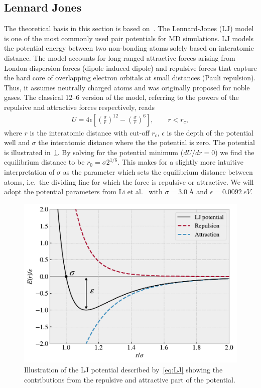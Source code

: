 \subsection{Lennard Jones}\label{sec:LJ}
The theoretical basis in this section is based on~\cite{docs_lammps_LJ,
C9CP05445F, chem_libretexts_LJ}. The Lennard-Jones (\acrshort{LJ}) model is one of the most commonly used pair potentials for \acrshort{MD} simulations. \acrshort{LJ} models the potential energy between two non-bonding atoms solely based on interatomic distance. The model accounts for long-ranged attractive forces arising from London dispersion forces (dipole-induced dipole) and repulsive forces that capture the hard core of overlapping electron orbitals at small distances (Pauli repulsion). Thus, it assumes neutrally charged atoms and was originally proposed for noble gases. The classical 12--6 version of the model, referring to the powers of the repulsive and attractive forces respectively, reads
\begin{align}
  U = 4\epsilon \left[\left(\frac{\sigma}{r}\right)^{12} - \left(\frac{\sigma}{r}\right)^6 \right ], \qquad r < r_c,
  \label{eq:LJ}
\end{align}
where $r$ is the interatomic distance with cut-off $r_c$, $\epsilon$ is the
depth of the potential well and $\sigma$ the interatomic distance where the
the potential is zero. The potential is illustrated in~\cref{fig:LJ_pot}. By solving for the potential minimum ($dU/dr = 0$) we find the equilibrium distance to be $r_0 = \sigma 2^{1/6}$. This makes for a slightly more intuitive interpretation of $\sigma$ as the parameter which sets the equilibrium distance between atoms, i.e.\ the dividing line for which the force is repulsive or attractive. We will adopt the potential parameters from Li et al.~\cite{li_evolving_2016} with $\sigma = \SI{3.0}{\text{Å}}$ and $\epsilon = \SI{0.0092}{eV}$.

\begin{figure}[H]
  \centering
  \includegraphics[width=0.6\linewidth]{figures/theory/LJ_pot.pdf}
  \caption{Illustration of the \acrshort{LJ} potential described by~\cref{eq:LJ} showing the contributions from the repulsive and attractive part of the potential.}
  \label{fig:LJ_pot}
\end{figure}


